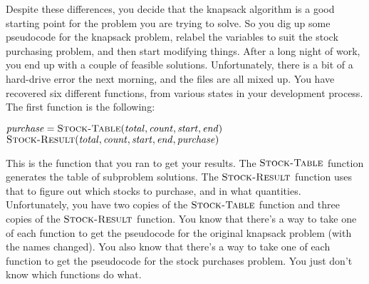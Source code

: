 \documentclass[12pt,twoside]{article}
\newcommand{\answerIIh}{\solution{
3 5
}}
\begin{document}
\begin{problems}
\begin{problemparts}
\begin{enumerate}
\end{enumerate}
\answerIIh

\end{problemparts}

Despite these differences,
you decide that the knapsack algorithm
is a good starting point
for the problem you are trying to solve.
So you dig up some pseudocode for the knapsack problem,
relabel the variables to suit the stock purchasing problem,
and then start modifying things.
After a long night of work,
you end up with a couple of feasible solutions.
Unfortunately,
there is a bit of a hard-drive error the next morning,
and the files are all mixed up.
You have recovered six different functions,
from various states in your development process.
The first function is the following:

\begin{codebox}
\li $\purchase = \proc{Stock-Table}
		(\total, \stockCount, \priceStart, \priceEnd)$
\li \Return $\proc{Stock-Result}
		(\total, \stockCount, \priceStart, \priceEnd, \purchase)$
\end{codebox}

This is the function that you ran to get your results.
The $\textnormal{\scshape Stock-Table}$ function
generates the table of subproblem solutions.
The $\textnormal{\scshape Stock-Result}$ function
uses that to figure out which stocks to purchase,
and in what quantities.
Unfortunately,
you have two copies of the $\textnormal{\scshape Stock-Table}$ function
and three copies of the $\textnormal{\scshape Stock-Result}$ function.
You know that there's a way to take one of each function
to get the pseudocode for the original knapsack problem
(with the names changed).
You also know that there's a way to take one of each function
to get the pseudocode for the stock purchases problem.
You just don't know which functions do what.


\end{problems}
\end{document}
